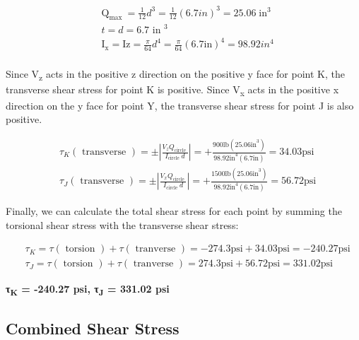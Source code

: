 \documentclass[
  letterpaper,
  DIV=11,
  numbers=noendperiod]{scrreprt}
\begin{document}
\begin{tcolorbox}
\begin{tcolorbox}
\[
\begin{aligned}
& \mathrm{Q}_{\text {max }}=\frac{1}{12} d^3=\frac{1}{12}(6.7 i n)^3=25.06 \operatorname{in}^3 \\
& t=d=6.7 \text { in }^3 \\
& \mathrm{I}_{\mathrm{x}}=\mathrm{Iz}=\frac{\pi}{64} d^4=\frac{\pi}{64}(6.7 \mathrm{in})^4=98.92 i n^4 \\
&
\end{aligned}
\]

Since V\textsubscript{z} acts in the positive z direction on the
positive y face for point K, the transverse shear stress for point K is
positive. Since V\textsubscript{x} acts in the positive x direction on
the y face for point Y, the transverse shear stress for point J is also
positive.

\[
\begin{aligned}
& \tau_K(\text { transverse })= \pm\left|\frac{V_z Q_{\text {circle }}}{I_{\text {circle }} d}\right|=+\frac{900 \mathrm{lb}\left(25.06 \mathrm{in}^3\right)}{98.92 \mathrm{in}^4(6.7 \mathrm{in})}=34.03 \mathrm{psi} \\
& \tau_J(\text { transverse })= \pm\left|\frac{V_x Q_{\text {circle }}}{I_{\text {circle }} d}\right|=+\frac{1500 \mathrm{lb}\left(25.06 \mathrm{in}^3\right)}{98.92 \mathrm{in}^4(6.7 \mathrm{in})}=56.72 \mathrm{psi}
\end{aligned}
\]

Finally, we can calculate the total shear stress for each point by
summing the torsional shear stress with the transverse shear stress:

\[
\begin{aligned}
& \tau_K=\tau(\text { torsion })+\tau(\text { tranverse })=-274.3 \mathrm{psi}+34.03 \mathrm{psi}=-240.27 \mathrm{psi} \\
& \tau_J=\tau(\text { torsion })+\tau(\text { tranverse })=274.3 \mathrm{psi}+56.72 \mathrm{psi}=331.02 \mathrm{psi}
\end{aligned}
\]

\textbf{τ\textsubscript{K} = -240.27 psi, τ\textsubscript{J} = 331.02
psi}

\end{tcolorbox}

\end{tcolorbox}

\subsection{Combined Shear Stress}\label{combined-shear-stress}
\end{document}
